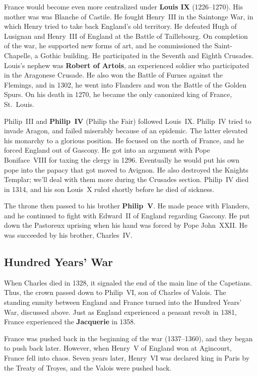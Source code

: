France would become even more centralized under \textbf{Louis IX} (1226--1270).
His mother was was Blanche of Castile.
He fought Henry~III in the Saintonge War, in which Henry tried to take back England's old territory.
He defeated Hugh of Lusignan and Henry~III of England at the Battle of Taillebourg.
On completion of the war, he supported new forms of art, and he commissioned the Saint-Chapelle, a Gothic building.
He participated in the Seventh and Eighth Crusades.
Louis's nephew was \textbf{Robert of Artois}, an experienced soldier who participated in the Aragonese Crusade.
He also won the Battle of Furnes against the Flemings,
and in 1302, he went into Flanders and won the Battle of the Golden Spurs.
On his death in 1270, he became the only canonized king of France, St.\ Louis.

Philip~III and \textbf{Philip~IV} (Philip the Fair) followed Louis~IX\@.
Philip~IV tried to invade Aragon, and failed miserably because of an epidemic.
The latter elevated his monarchy to a glorious position.
He focused on the north of France, and he forced England out of Gascony.
He got into an argument with Pope Boniface~VIII for taxing the clergy in 1296.
Eventually he would put his own pope into the papacy that got moved to Avignon.
He also destroyed the Knights Templar; we'll deal with them more during the Crusades section.
Philip~IV died in 1314, and his son Louis~X ruled shortly before he died of sickness.

The throne then passed to his brother \textbf{Philip~V}.
He made peace with Flanders, and he continued to fight with Edward~II of England regarding Gascony.
He put down the Pastoreux uprising when his hand was forced by Pope John~XXII\@.
He was succeeded by his brother, Charles~IV\@.

\subsection*{Hundred Years' War}

When Charles died in 1328, it signaled the end of the main line of the Capetians.
Thus, the crown passed down to Philip~VI, son of Charles of Valois.
The standing enmity between England and France turned into the Hundred Years' War, discussed above.
Just as England experienced a peasant revolt in 1381, France experienced the \textbf{Jacquerie} in 1358.

France was pushed back in the beginning of the war (1337--1360), and they began to push back later.
However, when Henry~V of England won at Agincourt, France fell into chaos.
Seven years later, Henry~VI was declared king in Paris by the Treaty of Troyes, and the Valois were pushed back.

